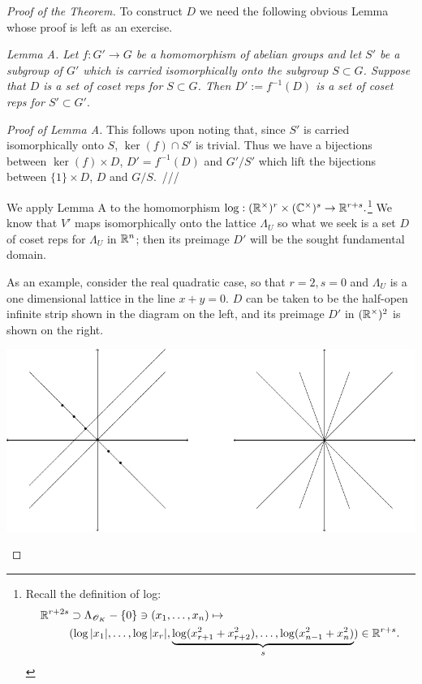 \documentclass[10pt,a4paper,reqno]{amsart}
\begin{document}
\begin{proof}[Proof of the Theorem]
To construct $D$ we need the following obvious Lemma whose proof is left as an
exercise.

\bigskip

\emph{Lemma A. Let $f : G'\rightarrow G$ be a homomorphism of abelian groups
and let $S'$ be a subgroup of $G'$ which is carried isomorphically onto the
subgroup $S\subset G$. Suppose that $D$ is a set of coset reps for $S \subset
G$. Then $D' := f^{-1}(D)$ is a set of coset reps for $S' \subset G'.$}

\emph{Proof of Lemma A.} This follows upon noting that, since $S'$ is carried
isomorphically onto $S$, $\ker(f)\cap S'$ is trivial. Thus we have a
bijections between $\ker(f) \times D$, $D' = f^{-1}(D)$ and $G'/S'$ which lift
the bijections between $\{1\} \times D$, $D$ and $G/S$.~///

\bigskip

We apply Lemma A to the homomorphism $\log : (\mathbb{R}^\times)^r\times (\mathbb{C}^\times)^s
\rightarrow \mathbb{R}^{r+s}.$\footnote{Recall the definition of log: \begin{align*}
\mathbb{R}^{r+2s} & \supset \Lambda_{\mathscr{O}_K} - \{0\} \ni (x_1,\dots,x_n) \mapsto \\ &
(\log|x_1|,\dots,\log|x_r|, \underbrace{\log(x^2_{r+1}+x^2_{r+2}),\dots,
\log(x_{n-1}^2+x_n^2)}_{s} ) \in \mathbb{R}^{r+s}.  \end{align*} } We know that $V'$
maps isomorphically onto the lattice $\Lambda_U$ so what we seek is a set $D$
of coset reps for $\Lambda_U$ in $\mathbb{R}^n$; then its preimage $D'$ will be the
sought fundamental domain.

As an example, consider the real quadratic case, so that $r=2,s=0$ and
$\Lambda_U$ is a one dimensional lattice in the line $x+y=0$. $D$ can be taken
to be the half-open infinite strip shown in the diagram on the left, and its
preimage $D'$ in $(\mathbb{R}^\times)^2$ is shown on the right.

\begin{center}
    \includegraphics[scale=0.8]{resources/marcus-fund-domain}
\end{center}


\end{proof}
\end{document}
